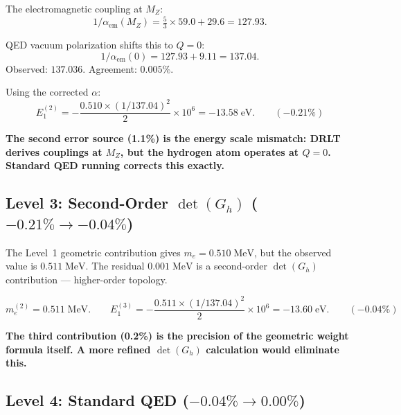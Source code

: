 The electromagnetic coupling at $M_Z$:
\begin{equation}
1/\alpha_\text{em}(M_Z) = \tfrac{5}{3} \times 59.0 + 29.6 = 127.93.
\end{equation}

QED vacuum polarization shifts this to $Q = 0$:
\begin{equation}
1/\alpha_\text{em}(0) = 127.93 + 9.11 = 137.04.
\end{equation}
Observed: $137.036$. Agreement: $0.005\%$.

Using the corrected $\alpha$:
\begin{equation}
E_1^{(2)} = -\frac{0.510 \times (1/137.04)^2}{2} \times 10^6 = -13.58\;\text{eV}. \qquad (-0.21\%)
\end{equation}

\textbf{The second error source (1.1\%) is the energy scale mismatch: DRLT derives couplings at $M_Z$, but the hydrogen atom operates at $Q = 0$. Standard QED running corrects this exactly.}

\subsection{Level 3: Second-Order $\det(G_h)$ ($-0.21\% \to -0.04\%$)}

The Level~1 geometric contribution gives $m_e = 0.510\;\text{MeV}$, but the observed value is $0.511\;\text{MeV}$. The residual $0.001\;\text{MeV}$ is a second-order $\det(G_h)$ contribution --- higher-order topology.

\begin{equation}
m_e^{(2)} = 0.511\;\text{MeV}. \qquad E_1^{(3)} = -\frac{0.511 \times (1/137.04)^2}{2} \times 10^6 = -13.60\;\text{eV}. \qquad (-0.04\%)
\end{equation}

\textbf{The third contribution (0.2\%) is the precision of the geometric weight formula itself. A more refined $\det(G_h)$ calculation would eliminate this.}

\subsection{Level 4: Standard QED ($-0.04\% \to 0.00\%$)}

